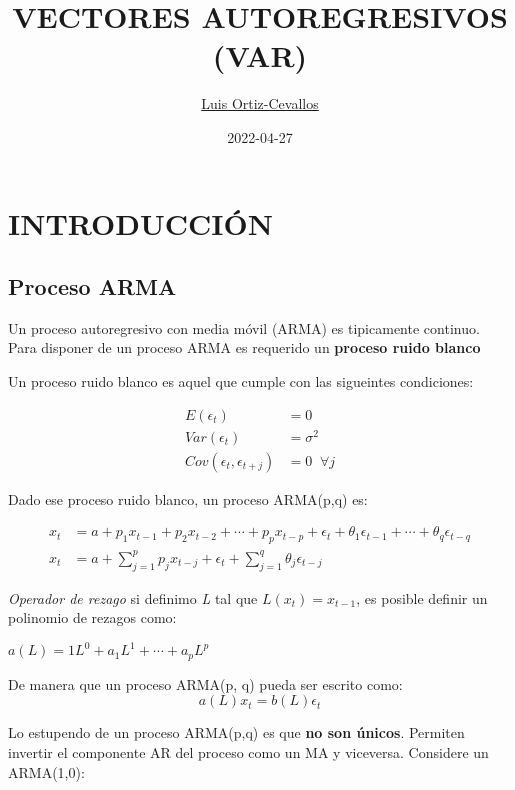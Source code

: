 \documentclass[
]{book}
\title{VECTORES AUTOREGRESIVOS (VAR)}
\author{\href{https://ortiz-cevallos.github.io/MYSELF/}{Luis Ortiz-Cevallos}}
\date{2022-04-27}
\begin{document}
\maketitle

{
\setcounter{tocdepth}{1}
\tableofcontents
}
\hypertarget{introducciuxf3n}{%
\chapter{INTRODUCCIÓN}\label{introducciuxf3n}}

\hypertarget{proceso-arma}{%
\section{Proceso ARMA}\label{proceso-arma}}

Un proceso autoregresivo con media móvil (ARMA) es tipicamente continuo. Para disponer de un proceso ARMA es requerido un \textbf{proceso ruido blanco}

Un proceso ruido blanco es aquel que cumple con las sigueintes condiciones:

\begin{align}
E(\epsilon_{t})&=0\\
Var(\epsilon_{t})&=\sigma^{2}\\
Cov(\epsilon_{t}, \epsilon_{t+j})&=0\;\; \forall j
\end{align}

Dado ese proceso ruido blanco, un proceso ARMA(p,q) es:

\begin{align}
x_{t}&= a+p_{1}x_{t-1}+p_{2}x_{t-2}+\cdots+p_{p}x_{t-p}+\epsilon_{t}+\theta_{1}\epsilon_{t-1}+\cdots+\theta_{q}\epsilon_{t-q}\\
x_{t}&= a+\sum_{j=1}^{p}p_{j}x_{t-j}+\epsilon_{t}+\sum_{j=1}^{q}\theta_{j}\epsilon_{t-j}
\end{align}

\emph{Operador de rezago} si definimo \emph{L} tal que \(L(x_{t})=x_{t-1}\), es posible definir un polinomio de rezagos como:

\(a(L)=1L^{0}+a_{1}L^{1}+\cdots+a_{p}L^{p}\)

De manera que un proceso ARMA(p, q) pueda ser escrito como:
\begin{equation}
a(L)x_{t}=b(L)\epsilon_{t}
\end{equation}

Lo estupendo de un proceso ARMA(p,q) es que \textbf{no son únicos}. Permiten invertir el componente AR del proceso como un MA y viceversa. Considere un ARMA(1,0):
\end{document}
